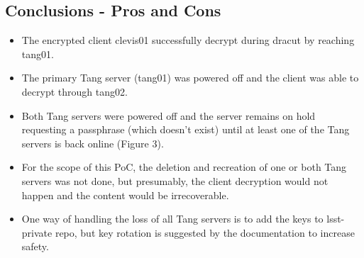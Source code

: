 \subsection{Conclusions - Pros and Cons}
\begin{itemize}
  \item The encrypted client clevis01 successfully decrypt during dracut by reaching tang01.
  \item The primary Tang server (tang01) was powered off and the client was able to decrypt through tang02.
  \item Both Tang servers were powered off and the server remains on hold requesting a passphrase (which doesn't exist) until at least one of the Tang servers is back online (Figure 3).
  \item For the scope of this PoC, the deletion and recreation of one or both Tang servers was not done, but presumably, the client decryption would not happen and the content would be irrecoverable.
  \item One way of handling the loss of all Tang servers is to add the keys to lsst-private repo, but key rotation is suggested by the documentation to increase safety.
\end{itemize}